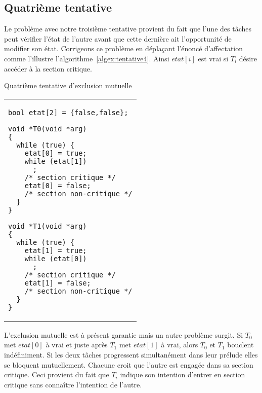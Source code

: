 \subsection*{Quatrième tentative}
Le problème avec notre troisième tentative provient du fait que l'une des tâches peut vérifier l'état de l'autre avant que cette dernière ait l'opportunité de modifier son état.  Corrigeons ce problème en déplaçant l'énoncé d'affectation comme l'illustre l'algorithme~\ref{algex:tentative4}.
Ainsi $etat[i]$ est vrai si $T_i$ désire accéder à la section critique.
\begin{algorithm}[!ht]
  \caption{Quatrième tentative d'exclusion mutuelle}\label{algex:tentative4}
  \centering
  \begin{tabular}{l}
    \lstset{language=C++}
    \begin{lstlisting}
bool etat[2] = {false,false};

void *T0(void *arg)
{
  while (true) {
    etat[0] = true;
    while (etat[1])
      ;
    /* section critique */
    etat[0] = false;
    /* section non-critique */
  }
}

void *T1(void *arg)
{
  while (true) {
    etat[1] = true;
    while (etat[0])
      ;
    /* section critique */
    etat[1] = false;
    /* section non-critique */
  }
}
\end{lstlisting}
  \end{tabular}

\end{algorithm}

L'exclusion mutuelle est à présent garantie mais un autre problème surgit.
Si $T_0$ met $etat[0]$ à vrai et juste après $T_1$ met $etat[1]$ à vrai, alors $T_0$ et $T_1$ bouclent indéfiniment.
Si les deux tâches progressent simultanément dans leur prélude elles se bloquent mutuellement.
Chacune croit que l'autre est engagée dans sa section critique.
Ceci provient du fait que $T_i$ indique son intention d'entrer en section critique sans connaître l'intention de l'autre.

